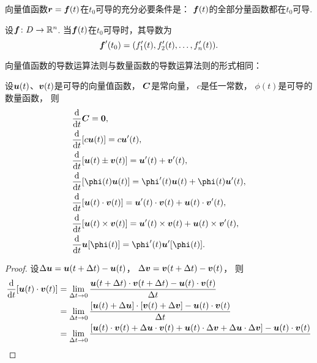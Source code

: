 \begin{theorem}
向量值函数\(\boldsymbol{r}=\boldsymbol{f}(t)\)在\(t_0\)可导的充分必要条件是：
\(\boldsymbol{f}(t)\)的全部分量函数都在\(t_0\)可导.
\end{theorem}

\begin{theorem}
设\(\boldsymbol{f}\colon D\to\mathbb{R}^n\).
当\(\boldsymbol{f}(t)\)在\(t_0\)可导时，其导数为
\begin{equation}
	\boldsymbol{f}'(t_0)
	= (f_1'(t),f_2'(t),\dotsc,f_n'(t)).
\end{equation}
\end{theorem}

向量值函数的导数运算法则与数量函数的导数运算法则的形式相同：
\begin{theorem}
设\(\boldsymbol{u}(t)\)、\(\boldsymbol{v}(t)\)是可导的向量值函数，
\(\boldsymbol{C}\)是常向量，
\(c\)是任一常数，
\(\phi(t)\)是可导的数量函数，
则\begin{align}
	&\dv{t} \vb{C}
		= \vb{0}, \\
	&\dv{t} [c \vb{u}(t)]
		= c \vb{u}'(t), \\
	&\dv{t} [\vb{u}(t) \pm \vb{v}(t)]
		= \vb{u}'(t) + \vb{v}'(t), \\
	&\dv{t} [\phi(t) \vb{u}(t)]
		= \phi'(t) \vb{u}(t) + \phi(t) \vb{u}'(t), \\
	&\dv{t} [\vb{u}(t) \cdot \vb{v}(t)]
		= \vb{u}'(t) \cdot \vb{v}(t) + \vb{u}(t) \cdot \vb{v}'(t), \\
	&\dv{t} [\vb{u}(t) \times \vb{v}(t)]
		= \vb{u}'(t) \times \vb{v}(t) + \vb{u}(t) \times \vb{v}'(t), \\
	&\dv{t} \vb{u}[\phi(t)]
		= \phi'(t) \vb{u}'[\phi(t)].
\end{align}
\begin{proof}
设\(\Delta\boldsymbol{u} = \boldsymbol{u}(t+\Delta t) - \boldsymbol{u}(t)\)，
\(\Delta\boldsymbol{v} = \boldsymbol{v}(t+\Delta t) - \boldsymbol{v}(t)\)，
则\begin{align*}
	\dv{t} [\boldsymbol{u}(t) \cdot \boldsymbol{v}(t)]
	&= \lim_{\Delta t\to0}
		\frac{
			\boldsymbol{u}(t+\Delta t) \cdot \boldsymbol{v}(t+\Delta t)
			- \boldsymbol{u}(t) \cdot \boldsymbol{v}(t)
		}{
			\Delta t
		} \\
	&= \lim_{\Delta t\to0}
		\frac{
			[\boldsymbol{u}(t) + \Delta\boldsymbol{u}] \cdot [\boldsymbol{v}(t) + \Delta\boldsymbol{v}]
			- \boldsymbol{u}(t) \cdot \boldsymbol{v}(t)
		}{
			\Delta t
		} \\
	&= \lim_{\Delta t\to0}
		\frac{
			[\boldsymbol{u}(t) \cdot \boldsymbol{v}(t) + \Delta\boldsymbol{u} \cdot \boldsymbol{v}(t)
			+ \boldsymbol{u}(t) \cdot \Delta\boldsymbol{v} + \Delta\boldsymbol{u} \cdot \Delta\boldsymbol{v}]
			- \boldsymbol{u}(t) \cdot \boldsymbol{v}(t)
		}{
}
\end{align*}
\end{proof}
\end{theorem}
